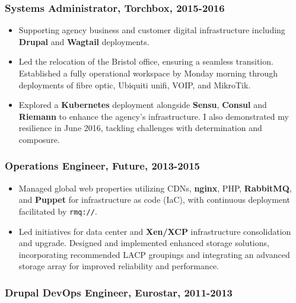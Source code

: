 \documentclass[
]{article}
\begin{document}
\hypertarget{material-office-building-systems-administrator-torchbox-2015-2016}{%
\subsubsection{\texorpdfstring{\faBuilding Systems Administrator,
Torchbox,
2015-2016}{ Systems Administrator, Torchbox, 2015-2016}}\label{material-office-building-systems-administrator-torchbox-2015-2016}}

\begin{itemize}
\item
  Supporting agency business and customer digital infrastructure
  including \textbf{Drupal} and \textbf{Wagtail} deployments.
\item
  Led the relocation of the Bristol office, ensuring a seamless
  transition. Established a fully operational workspace by Monday
  morning through deployments of fibre optic, Ubiquiti unifi, VOIP, and
  MikroTik.
\item
  Explored a \textbf{Kubernetes} deployment alongside \textbf{Sensu},
  \textbf{Consul} and \textbf{Riemann} to enhance the agency's
  infrastructure. I also demonstrated my resilience in June 2016,
  tackling challenges with determination and composure.
\end{itemize}

\hypertarget{material-office-building-operations-engineer-future-2013-2015}{%
\subsubsection{\texorpdfstring{\faBuilding Operations Engineer, Future,
2013-2015}{ Operations Engineer, Future, 2013-2015}}\label{material-office-building-operations-engineer-future-2013-2015}}

\begin{itemize}
\item
  Managed global web properties utilizing CDNs, \textbf{nginx}, PHP,
  \textbf{RabbitMQ}, and \textbf{Puppet} for infrastructure as code
  (IaC), with continuous deployment facilitated by \texttt{rmq://}.
\item
  Led initiatives for data center and \textbf{Xen/XCP} infrastructure
  consolidation and upgrade. Designed and implemented enhanced storage
  solutions, incorporating recommended LACP groupings and integrating an
  advanced storage array for improved reliability and performance.
\end{itemize}

\hypertarget{material-train-drupal-devops-engineer-eurostar-2011-2013}{%
\subsubsection{\texorpdfstring{\faTrain Drupal DevOps Engineer,
Eurostar,
2011-2013}{ Drupal DevOps Engineer, Eurostar, 2011-2013}}\label{material-train-drupal-devops-engineer-eurostar-2011-2013}}
\end{document}
